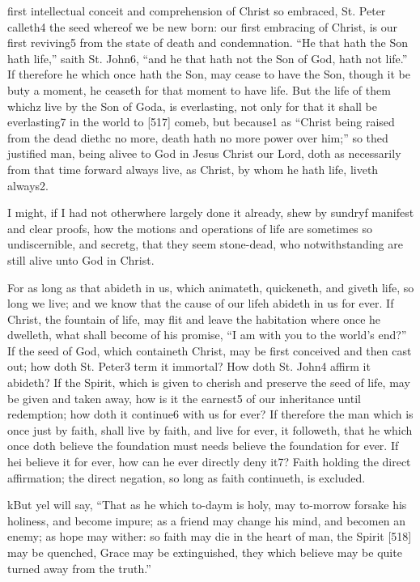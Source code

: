 first intellectual conceit and comprehension of Christ so embraced, St. Peter calleth4 the seed whereof we be new born: our first embracing of Christ, is our first reviving5 from the state of death and condemnation. “He that hath the Son hath life,” saith St. John6, “and he that hath not the Son of God, hath not life.” If therefore he which once hath the Son, may cease to have the Son, though it be buty a moment, he ceaseth for that moment to have life. But the life of them whichz live by the Son of Goda, is everlasting, not only for that it shall be everlasting7 in the world to [517] comeb, but because1 as “Christ being raised from the dead diethc no more, death hath no more power over him;” so thed justified man, being alivee to God in Jesus Christ our Lord, doth as necessarily from that time forward always live, as Christ, by whom he hath life, liveth always2.

I might, if I had not otherwhere largely done it already, shew by sundryf manifest and clear proofs, how the motions and operations of life are sometimes so undiscernible, and secretg, that they seem stone-dead, who notwithstanding are still alive unto God in Christ.

For as long as that abideth in us, which animateth, quickeneth, and giveth life, so long we live; and we know that the cause of our lifeh abideth in us for ever. If Christ, the fountain of life, may flit and leave the habitation where once he dwelleth, what shall become of his promise, “I am with you to the world’s end?” If the seed of God, which containeth Christ, may be first conceived and then cast out; how doth St. Peter3 term it immortal? How doth St. John4 affirm it abideth? If the Spirit, which is given to cherish and preserve the seed of life, may be given and taken away, how is it the earnest5 of our inheritance until redemption; how doth it continue6 with us for ever? If therefore the man which is once just by faith, shall live by faith, and live for ever, it followeth, that he which once doth believe the foundation must needs believe the foundation for ever. If hei believe it for ever, how can he ever directly deny it7? Faith holding the direct affirmation; the direct negation, so long as faith continueth, is excluded.

kBut yel will say, “That as he which to-daym is holy, may to-morrow forsake his holiness, and become impure; as a friend may change his mind, and becomen an enemy; as hope may wither: so faith may die in the heart of man, the Spirit [518] may be quenched, Grace may be extinguished, they which believe may be quite turned away from the truth.”


